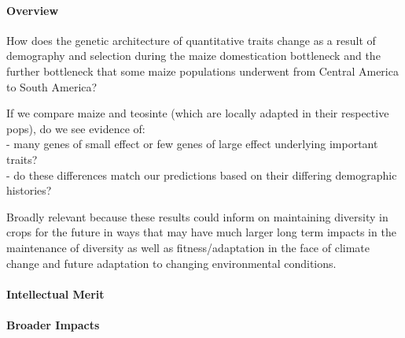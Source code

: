 
\paragraph{Overview} 
How does the genetic architecture of quantitative traits change as a result of demography and selection during the maize domestication bottleneck and the further bottleneck that some maize populations underwent from Central America to South America?
	
If we compare maize and teosinte (which are locally adapted in their respective pops), do we see evidence of:\\
	\indent - many genes of small effect or few genes of large effect underlying important traits?\\
	\indent - do these differences match our predictions based on their differing demographic histories?
	
Broadly relevant because these results could inform on maintaining diversity in crops for the future in ways that may have much larger long term impacts in the maintenance of diversity as well as fitness/adaptation in the face of climate change and future adaptation to changing environmental conditions.

\paragraph{Intellectual Merit}  

\paragraph{Broader Impacts}

\begin{comment}
 Prepare Project Summary (limited to one page) of Proposed Fellowship Activities, including both
research and training. Select GO next to Project Summary. This is an abstract of the proposed research
and training. You must clearly address and identify in separate statements using the three boxes: (1) an
overview of your proposed fellowship activities; (2) intellectual merit; and (3) broader impacts of the
activities. Without these 3 sections, your application will be returned without review. List your
sponsoring scientist(s) and institution(s) in the overview. Upload text in the proper boxes. Do not use
the Supplementary Document option for the summary. Do not use jargon and abbreviations in the
summary. It should be understandable by scientists not in your specialized field

\end{comment}